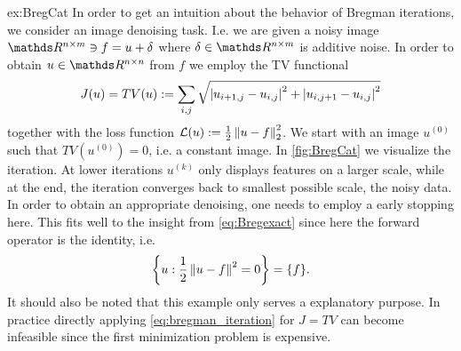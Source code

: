 \begin{example}{}{ex:BregCat}
	In order to get an intuition about the behavior of Bregman iterations, we consider an image denoising task. I.e. we are given a noisy image $\R^{n\times m}\ni f = u + \delta$ where $\delta\in\R^{n\times m}$ is additive noise. In order to obtain $u\in\R^{n\times n}$ from $f$ we employ the TV functional \cite{rudin1992nonlinear} 
	\begin{align*}
		J(u) = TV(u) := \sum_{i,j} \sqrt{\left|u_{i+1, j} - u_{i,j}\right|^2 + \left|u_{i,j+1} - u_{i,j}\right|^2}
	\end{align*}
	together with the loss function $\mathcal{L}(u):= \frac{1}{2}\left\|u-f\right\|^2_2$.
	We start with an image $u^{(0)}$ such that $TV(u^{(0)})=0$, i.e. a constant image. In \cref{fig:BregCat} we visualize the iteration. At lower iterations $u^{(k)}$ only displays features on a larger scale, while at the end, the iteration converges back to smallest possible scale, the noisy data. In order to obtain an appropriate denoising, one needs to employ a early stopping here. This fits well to the insight from \cref{eq:Bregexact} since here the forward operator is the identity, i.e.
	\begin{align*}
		\left\{ u: \frac{1}{2}\left\|u-f\right\|^2=0\right\} = \{f\}. 
	\end{align*}
	It should also be noted that this example only serves a explanatory purpose. In practice directly applying \cref{eq:bregman_iteration} for $J=TV$ can become infeasible since the first minimization problem is expensive.
\end{example}%
%
%
%
%
